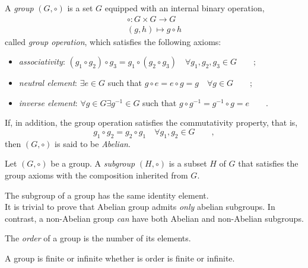 \begin{definition}[Group]\label{def:group-axioms}
    A \emph{group} $(G,\circ)$ is a set $G$ equipped with an internal binary operation,
    \begin{align*}
        \circ \colon G \times G \to G \\
        \left(g , h \right) \mapsto g \circ h 
    \end{align*} 
    called \emph{group operation}, which satisfies the following axioms:
    \begin{itemize}
        \item \emph{associativity}: $(g_1 \circ g_2) \circ g_3 = g_1 \circ (g_2 \circ g_3) \quad \forall g_1, g_2, g_3 \in G \qquad ;$
        \item \emph{neutral element}: $\exists e \in G$ such that $ g \circ e = e \circ g = g \quad \forall g \in G \qquad ;$
        \item \emph{inverse element}: $\forall g \in G \exists g^{-1} \in G$ such that $g \circ g^{-1} = g^{-1} \circ g = e \qquad .$
    \end{itemize}
    If, in addition, the group operation satisfies the commutativity property, that is, 
    \begin{equation*}
        g_1 \circ g_2 = g_2 \circ g_1 \quad \forall g_1, g_2 \in G \qquad ,
    \end{equation*}
    then $(G,\circ)$ is said to be \emph{Abelian}.
\end{definition}

\begin{definition}[Subgroup]
    Let $(G, \circ)$ be a group. A \emph{subgroup} $(H,\circ)$ is a subset $H$ of $G$ that satisfies the group axioms with the composition inherited from $G$.
\end{definition}

\begin{remark}
    The subgroup of a group has the same identity element. \\
    It is trivial to prove that Abelian group admits \emph{only} abelian subgroups. In contrast, a non-Abelian group \emph{can} have both Abelian and non-Abelian subgroups.
\end{remark}

\begin{definition}
    The \emph{order} of a group is the number of its elements.
\end{definition}

\begin{remark}
    A group is finite or infinite whether is order is finite or infinite.
\end{remark}

